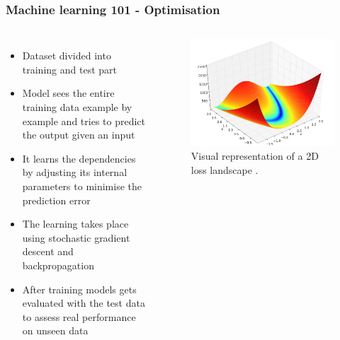 \documentclass[10pt, presentation]{beamer}
\begin{document}
    \begin{frame}
        \frametitle{Machine learning 101 - Optimisation}
        \begin{columns}
            \begin{itemize}
                \item Dataset divided into training and test part
                \item Model sees the entire training data example by example and tries to predict the output given an input
                \item It learns the dependencies by adjusting its internal parameters to minimise the prediction error
                \item The learning takes place using stochastic gradient descent and backpropagation
                \item After training models gets evaluated with the test data to assess real performance on unseen data
            \end{itemize}
            \begin{figure}
                \centerline{\includegraphics[scale=0.28,keepaspectratio]{figures/loss_landscape.png}}
                \caption{Visual representation of a 2D loss landscape \cite{Goodfellow-et-al-2016}.}
            \end{figure}
        \end{columns}
    \end{frame}
\end{document}
